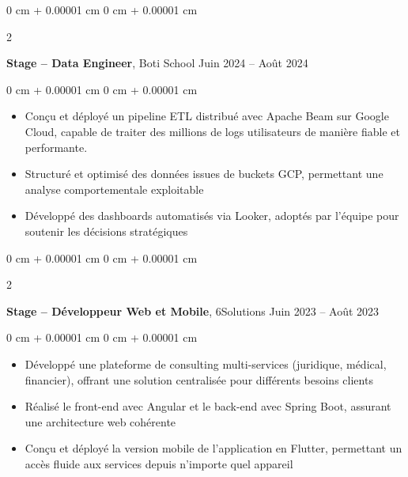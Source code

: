 \documentclass[10pt, letterpaper]{article}
\newenvironment{highlights}{
    \begin{itemize}[
        topsep=0.10 cm,
        parsep=0.10 cm,
        partopsep=0pt,
        itemsep=0pt,
        leftmargin=0 cm + 10pt
    ]
}{
    \end{itemize}
} %
\newenvironment{onecolentry}{
    \begin{adjustwidth}{
        0 cm + 0.00001 cm
    }{
        0 cm + 0.00001 cm
    }
}{
    \end{adjustwidth}
} %
\newenvironment{twocolentry}[2][]{
    \onecolentry
    \def\secondColumn{#2}
    \setcolumnwidth{\fill, 4.5 cm}
    \begin{paracol}{2}
}{
    \switchcolumn \raggedleft \secondColumn
    \end{paracol}
    \endonecolentry
} %
\begin{document}
        \vspace{0.2 cm}
        
        \begin{twocolentry}{
            Juin 2024 – Août 2024
        }
            \textbf{Stage – Data Engineer}, Boti School \end{twocolentry}

        \vspace{0.10 cm}
        \begin{onecolentry}
            \begin{highlights}
                \item Conçu et déployé un pipeline ETL distribué avec Apache Beam sur Google Cloud, capable de traiter des millions de logs utilisateurs de manière fiable et performante.  
                \item Structuré et optimisé des données issues de buckets GCP, permettant une analyse comportementale exploitable
                \item Développé des dashboards automatisés via Looker, adoptés par l’équipe pour soutenir les décisions stratégiques
                
            \end{highlights}
        \end{onecolentry}



        \vspace{0.2 cm}

        \begin{twocolentry}{
            Juin 2023 – Août 2023
        }
            \textbf{Stage – Développeur Web et Mobile}, 6Solutions\end{twocolentry}

        \vspace{0.10 cm}
        \begin{onecolentry}
            \begin{highlights}
                \item Développé une plateforme de consulting multi-services (juridique, médical, financier), offrant une solution centralisée pour différents besoins clients 
                \item Réalisé le front-end avec Angular et le back-end avec Spring Boot, assurant une architecture web cohérente
                \item Conçu et déployé la version mobile de l’application en Flutter, permettant un accès fluide aux services depuis n’importe quel appareil
    
            \end{highlights}
        \end{onecolentry}
\end{document}
